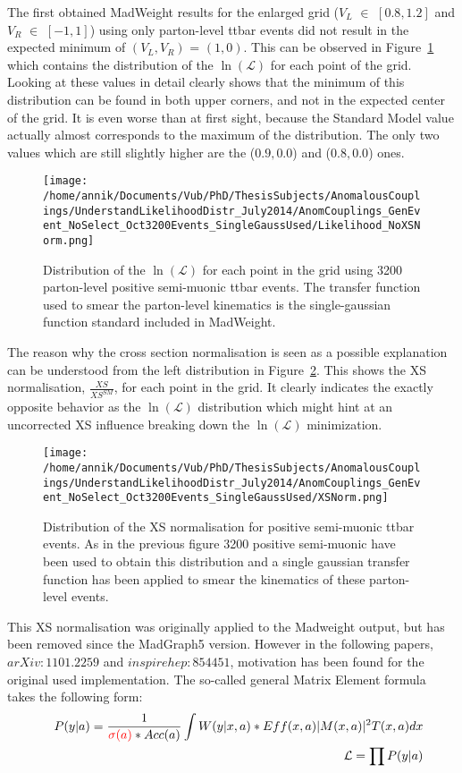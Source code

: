 The first obtained MadWeight results for the enlarged grid ($V_L$ $\in$ $[0.8,1.2]$ and $V_R$ $\in$ $[-1,1]$) using only parton-level ttbar events did not result in the expected minimum of $(V_L,V_R)$ = $(1, 0)$. This can be observed in Figure~\ref{fig::Likelihood} which contains the distribution of the $\ln(\mathcal{L})$ for each point of the grid. Looking at these values in detail clearly shows that the minimum of this distribution can be found in both upper corners, and not in the expected center of the grid. It is even worse than at first sight, because the Standard Model value actually almost corresponds to the maximum of the distribution. The only two values which are still slightly higher are the ($0.9,0.0$) and ($0.8,0.0$) ones.\\
\begin{figure}[htb!]
 \centering
 \texttt{[image: /home/annik/Documents/Vub/PhD/ThesisSubjects/AnomalousCouplings/UnderstandLikelihoodDistr\_July2014/AnomCouplings\_GenEvent\_NoSelect\_Oct3200Events\_SingleGaussUsed/Likelihood\_NoXSNorm.png]}
 \caption{Distribution of the $\ln(\mathcal{L})$ for each point in the grid using 3200 parton-level positive semi-muonic ttbar events. The transfer function used to smear the parton-level kinematics is the single-gaussian function standard included in MadWeight.}
 \label{fig::Likelihood}
\end{figure}

The reason why the cross section normalisation is seen as a possible explanation can be understood from the left distribution in Figure~\ref{fig::XS}. This shows the XS normalisation, $\frac{XS}{XS^{SM}}$, for each point in the grid. It clearly indicates the exactly opposite behavior as the $\ln(\mathcal{L})$ distribution which might hint at an uncorrected XS influence breaking down the $\ln(\mathcal{L})$ minimization.
\begin{figure}
  \texttt{[image: /home/annik/Documents/Vub/PhD/ThesisSubjects/AnomalousCouplings/UnderstandLikelihoodDistr\_July2014/AnomCouplings\_GenEvent\_NoSelect\_Oct3200Events\_SingleGaussUsed/XSNorm.png]}
 \caption{Distribution of the XS normalisation for positive semi-muonic ttbar events. As in the previous figure 3200 positive semi-muonic have been used to obtain this distribution and a single gaussian transfer function has been applied to smear the kinematics of these parton-level events.}
 \label{fig::XS}
\end{figure}

This XS normalisation was originally applied to the Madweight output, but has been removed since the MadGraph5 version. However in the following papers, $arXiv:1101.2259$ and $inspirehep:854451$, motivation has been found for the original used implementation. The so-called general Matrix Element formula takes the following form:
\begin{eqnarray}
 & & P(y \vert a) = \frac{1}{\textcolor{red}{\sigma(a)}*Acc(a)} \int W(y|x,a)*Eff(x,a) \vert M(x,a) \vert^{2} T(x,a) dx \label{eq::ProbMW}\\
 & & \mathcal{L} = \prod P(y \vert a)
\end{eqnarray}

